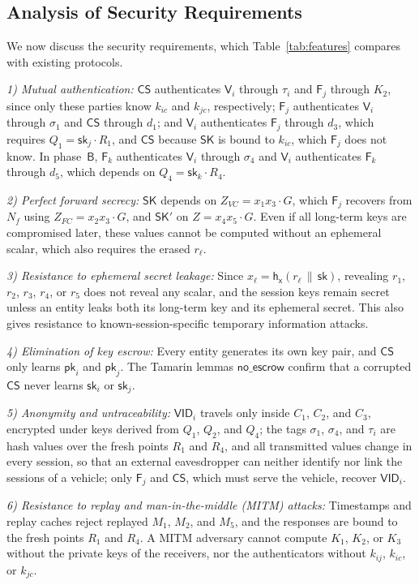 \documentclass[journal]{IEEEtran}
\theoremstyle{plain}
\theoremstyle{definition}
\newcommand{\Veh}{\mathsf{V}}            %
\newcommand{\Fog}{\mathsf{F}}            %
\newcommand{\CS}{\mathsf{CS}}            %
\newcommand{\SK}{\mathsf{SK}}            %
\newcommand{\VID}{\mathsf{VID}}          %
\newcommand{\h}{\mathsf{h}}              %
\newcommand{\hT}[1]{\h_{\mathsf{#1}}}     %
\newcommand{\sk}{\mathsf{sk}}            %
\newcommand{\pk}{\mathsf{pk}}            %
\newcommand{\cat}{\,\|\,}               %
\begin{document}
\subsection{Analysis of Security Requirements}\label{sec:informal}
We now discuss the security requirements, which Table~\ref{tab:features} compares with existing protocols.

\emph{1) Mutual authentication:} $\CS$ authenticates $\Veh_i$ through $\tau_i$ and $\Fog_j$ through $K_2$, since only these parties know $k_{ic}$ and $k_{jc}$, respectively; $\Fog_j$ authenticates $\Veh_i$ through $\sigma_1$ and $\CS$ through $d_1$; and $\Veh_i$ authenticates $\Fog_j$ through $d_3$, which requires $Q_1=\sk_j\cdot R_1$, and $\CS$ because $\SK$ is bound to $k_{ic}$, which $\Fog_j$ does not know. In phase~$\mathsf{B}$, $\Fog_k$ authenticates $\Veh_i$ through $\sigma_4$ and $\Veh_i$ authenticates $\Fog_k$ through $d_5$, which depends on $Q_4=\sk_k\cdot R_4$.

\emph{2) Perfect forward secrecy:} $\SK$ depends on $Z_{VC}=x_1x_3\cdot G$, which $\Fog_j$ recovers from $N_f$ using $Z_{FC}=x_2x_3\cdot G$, and $\SK'$ on $Z=x_4x_5\cdot G$. Even if all long-term keys are compromised later, these values cannot be computed without an ephemeral scalar, which also requires the erased $r_\ell$.

\emph{3) Resistance to ephemeral secret leakage:} Since $x_\ell=\hT{x}(r_\ell\cat\sk)$, revealing $r_1$, $r_2$, $r_3$, $r_4$, or $r_5$ does not reveal any scalar, and the session keys remain secret unless an entity leaks both its long-term key and its ephemeral secret. This also gives resistance to known-session-specific temporary information attacks.

\emph{4) Elimination of key escrow:} Every entity generates its own key pair, and $\CS$ only learns $\pk_i$ and $\pk_j$. The Tamarin lemmas $\mathsf{no\_escrow}$ confirm that a corrupted $\CS$ never learns $\sk_i$ or $\sk_j$.

\emph{5) Anonymity and untraceability:} $\VID_i$ travels only inside $C_1$, $C_2$, and $C_3$, encrypted under keys derived from $Q_1$, $Q_2$, and $Q_4$; the tags $\sigma_1$, $\sigma_4$, and $\tau_i$ are hash values over the fresh points $R_1$ and $R_4$, and all transmitted values change in every session, so that an external eavesdropper can neither identify nor link the sessions of a vehicle; only $\Fog_j$ and $\CS$, which must serve the vehicle, recover $\VID_i$.

\emph{6) Resistance to replay and man-in-the-middle (MITM) attacks:} Timestamps and replay caches reject replayed $M_1$, $M_2$, and $M_5$, and the responses are bound to the fresh points $R_1$ and $R_4$. A MITM adversary cannot compute $K_1$, $K_2$, or $K_3$ without the private keys of the receivers, nor the authenticators without $k_{ij}$, $k_{ic}$, or $k_{jc}$.
\end{document}
